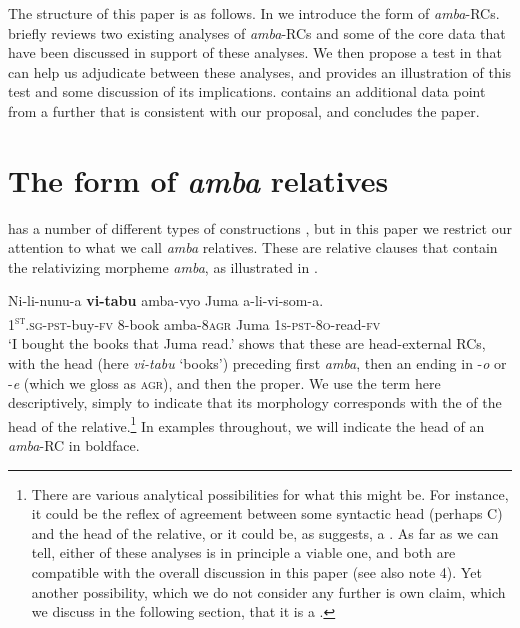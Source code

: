 \documentclass[output=paper,modfonts,nonflat,
colorlinks, citecolor=brown,
]{langsci/langscibook}
\begin{document}
The structure of this paper is as follows. In  we introduce the form of \textit{amba}{}-RCs.  briefly reviews two existing analyses of \textit{amba}{}-RCs and some of the core data that have been discussed in support of these analyses. We then propose a test in  that can help us adjudicate between these analyses, and  provides an illustration of this test and some discussion of its implications.  contains an additional data point from a further  that is consistent with our proposal, and  concludes the paper. 

\section{The form of \textit{amba} relatives}\label{sec:gould:2}
 
 has a number of different types of  constructions \citep[cf.][]{Ngonyani2001}, but in this paper we restrict our attention to what we call \textit{amba} relatives. These are relative clauses that contain the relativizing morpheme \textit{amba}, as illustrated in . 
 
\ea
\gll Ni-li-nunu-a \textbf{vi-tabu} amba-vyo Juma a-li-vi-som-a.\\
\textsc{1\textsuperscript{st}}\textsc{.sg-pst}{}-buy-\textsc{fv} 8-book amba{}-8\textsc{agr} Juma \textsc{1s-pst-8o}{}-read-\textsc{fv}\\
\glt ‘I bought the books that Juma read.’  \label{ex:gould:1}
\z
{} shows that these are head-external RCs, with the head (here \textit{vi-tabu} ‘books’) preceding first \textit{amba}, then an  ending in -\textit{o} or -\textit{e} (which we gloss as \textsc{agr}), and then the  proper.   We use the term  here descriptively, simply to indicate that its morphology corresponds  with the  of the head of the relative.\footnote{There are various analytical possibilities for what this  might be. For instance, it could be the reflex of agreement between some syntactic head (perhaps C) and the head of the relative, or it could be, as \citet{Henderson2006} suggests, a . As far as we can tell, either of these analyses is in principle a viable one, and both are compatible with the overall discussion in this paper (see also note 4). Yet another possibility, which we do not consider any further is  own claim, which we discuss in the following section, that it is a .} In examples throughout, we will indicate the head of an \textit{amba}{}-RC in boldface.
\end{document}
